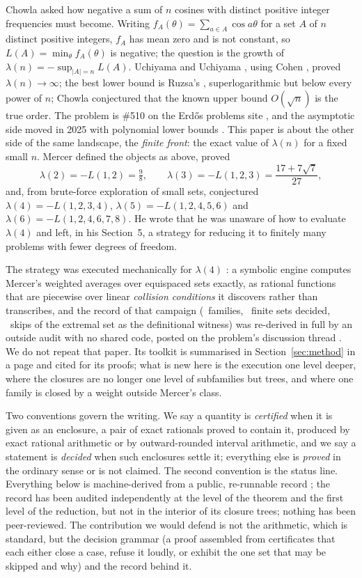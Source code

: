 \documentclass[11pt]{article}
\newcommand{\Lf}{L(1,2,4,5,6)}
\newcommand{\Ls}{L(1,2,4,6,7,8)}
\begin{document}
Chowla asked how negative a sum of $n$ cosines with distinct positive integer frequencies must become. Writing $f_A(\theta)=\sum_{a\in A}\cos a\theta$ for a set $A$ of $n$ distinct positive integers, $f_A$ has mean zero and is not constant, so $L(A)=\min_\theta f_A(\theta)$ is negative; the question is the growth of $\lambda(n)=-\sup_{|A|=n}L(A)$. Uchiyama and Uchiyama \cite{UU60}, using Cohen \cite{Co60}, proved $\lambda(n)\to\infty$; the best lower bound is Ruzsa's \cite{Ru04}, superlogarithmic but below every power of $n$; Chowla \cite{Ch65} conjectured that the known upper bound $O(\sqrt n)$ is the true order. The problem is \#510 on the Erd\H{o}s problems site \cite{EP510}, and the asymptotic side moved in 2025 with polynomial lower bounds \cite{Be25,JMTZ25}. This paper is about the other side of the same landscape, the \emph{finite front}: the exact value of $\lambda(n)$ for a fixed small $n$. Mercer \cite{Me19} defined the objects as above, proved
\[
\lambda(2)=-L(1,2)=\tfrac98,\qquad \lambda(3)=-L(1,2,3)=\frac{17+7\sqrt7}{27},
\]
and, from brute-force exploration of small sets, conjectured $\lambda(4)=-L(1,2,3,4)$, $\lambda(5)=-\Lf$ and $\lambda(6)=-\Ls$. He wrote that he was unaware of how to evaluate $\lambda(4)$ and left, in his Section~5, a strategy for reducing it to finitely many problems with fewer degrees of freedom.

The strategy was executed mechanically for $\lambda(4)$ \cite{L4}: a symbolic engine computes Mercer's weighted averages over equispaced sets exactly, as rational functions that are piecewise over linear \emph{collision conditions} it discovers rather than transcribes, and the record of that campaign (\LfourFamilies\ families, \LfourSets\ finite sets decided, \LfourSkips\ skips of the extremal set as the definitional witness) was re-derived in full by an outside audit with no shared code, posted on the problem's discussion thread \cite{Audit392}. We do not repeat that paper. Its toolkit is summarised in Section~\ref{sec:method} in a page and cited for its proofs; what is new here is the execution one level deeper, where the closures are no longer one level of subfamilies but trees, and where one family is closed by a weight outside Mercer's class.

Two conventions govern the writing. We say a quantity is \emph{certified} when it is given as an enclosure, a pair of exact rationals proved to contain it, produced by exact rational arithmetic or by outward-rounded interval arithmetic, and we say a statement is \emph{decided} when such enclosures settle it; everything else is \emph{proved} in the ordinary sense or is not claimed. The second convention is the status line. Everything below is machine-derived from a public, re-runnable record \cite{L5page}; the record has been audited independently at the level of the theorem and the first level of the reduction, but not in the interior of its closure trees; nothing has been peer-reviewed. The contribution we would defend is not the arithmetic, which is standard, but the decision grammar (a proof assembled from certificates that each either close a case, refuse it loudly, or exhibit the one set that may be skipped and why) and the record behind it.
\end{document}
